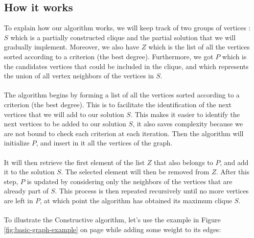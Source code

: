 
\subsection{How it works}

    To explain how our algorithm works, we will keep track of two groups of vertices : $S$ which is a partially constructed clique and the partial solution that we will gradually implement. Moreover, we also have $Z$ which is the list of all the vertices sorted according to a criterion (the best degree). Furthermore, we got $P$  which is the candidates vertices that could be included in the clique, and which represents the union of all vertex neighbors of the vertices in $S$.
    \\ \\
    The algorithm begins by forming a list of all the vertices sorted according to a criterion (the best degree). This is to facilitate the identification of the next vertices that we will add to our solution $S$. This makes it easier to identify the next vertices to be added to our solution $S$, it also saves complexity because we are not bound to check each criterion at each iteration. Then the algorithm will initialize $P$, and insert in it all the vertices of the graph.
    \\ \\
    It will then retrieve the first element of the list $Z$ that also belongs to $P$, and add it to the solution $S$. The selected element will then be removed from $Z$. After this step, $P$ is updated by considering only the neighbors of the vertices that are already part of $S$. This process is then repeated recursively until no more vertices are left in $P$, at which point the algorithm has obtained its maximum clique $S$.
    \\ \\
    To illustrate the Constructive algorithm, let's use the example in
    Figure \ref{fig:basic-graph-example} on page \pageref{fig:basic-graph-example} while adding some weight to its edges: \\


